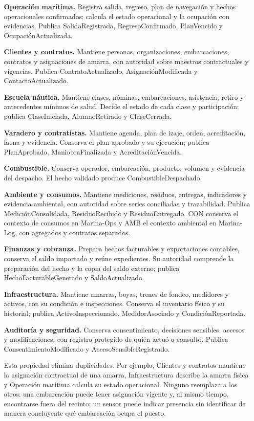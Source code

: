\textbf{Operación marítima.} Registra salida, regreso, plan de navegación y hechos operacionales confirmados; calcula el estado operacional y la ocupación con evidencias. Publica SalidaRegistrada, RegresoConfirmado, PlanVencido y OcupaciónActualizada.

\textbf{Clientes y contratos.} Mantiene personas, organizaciones, embarcaciones, contratos y asignaciones de amarra, con autoridad sobre maestros contractuales y vigencias. Publica ContratoActualizado, AsignaciónModificada y ContactoActualizado.

\textbf{Escuela náutica.} Mantiene clases, nóminas, embarcaciones, asistencia, retiro y antecedentes mínimos de salud. Decide el estado de cada clase y participación; publica ClaseIniciada, AlumnoRetirado y ClaseCerrada.

\textbf{Varadero y contratistas.} Mantiene agenda, plan de izaje, orden, acreditación, faena y evidencia. Conserva el plan aprobado y su ejecución; publica PlanAprobado, ManiobraFinalizada y AcreditaciónVencida.

\textbf{Combustible.} Conserva operador, embarcación, producto, volumen y evidencia del despacho. El hecho validado produce CombustibleDespachado.

\textbf{Ambiente y consumos.} Mantiene mediciones, residuos, entregas, indicadores y evidencia ambiental, con autoridad sobre series conciliadas y trazabilidad. Publica MediciónConsolidada, ResiduoRecibido y ResiduoEntregado. CON conserva el contexto de consumos en Marina-Ops y AMB el contexto ambiental en Marina-Log, con agregados y contratos separados.

\textbf{Finanzas y cobranza.} Prepara hechos facturables y exportaciones contables, conserva el saldo importado y reúne expedientes. Su autoridad comprende la preparación del hecho y la copia del saldo externo; publica HechoFacturableGenerado y SaldoActualizado.

\textbf{Infraestructura.} Mantiene amarras, boyas, trenes de fondeo, medidores y activos, con su condición e inspecciones. Conserva el inventario físico y su historial; publica ActivoInspeccionado, MedidorAsociado y CondiciónReportada.

\textbf{Auditoría y seguridad.} Conserva consentimiento, decisiones sensibles, accesos y modificaciones, con registro protegido de quién actuó o consultó. Publica ConsentimientoModificado y AccesoSensibleRegistrado.

Esta propiedad elimina duplicidades. Por ejemplo, Clientes y contratos mantiene la asignación contractual de una amarra, Infraestructura describe la amarra física y Operación marítima calcula su estado operacional. Ninguno reemplaza a los otros: una embarcación puede tener asignación vigente y, al mismo tiempo, encontrarse fuera del recinto; un sensor puede indicar presencia sin identificar de manera concluyente qué embarcación ocupa el puesto.


